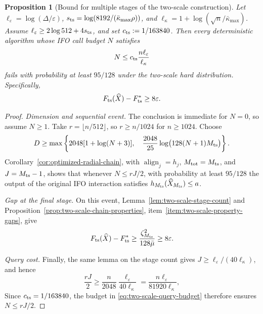 \documentclass{article}
\newtheorem{proposition}[theorem]{Proposition}
\theoremstyle{definition}
\begin{document}
\begin{proposition}[Bound for multiple stages of the two-scale construction]
\label{prop:two-scale-high-precision}
Let
$\ell_\varepsilon=\log(\Delta/\varepsilon)$,
$s_{\rm ts}=\log(8192/(\bar\kappa_{\max}\rho))$, and
$\ell_\kappa=1+\log(\sqrt n/\bar\kappa_{\max})$.
Assume
$\ell_\varepsilon\ge2\log512+4s_{\rm ts}$, and set
$c_{\rm ts}:=1/163840$.
Then every deterministic algorithm whose IFO call budget $N$ satisfies
\begin{equation}
 N\le c_{\rm ts}\frac{n\ell_\varepsilon}{\ell_\kappa}
 \label{eq:two-scale-query-budget}
\end{equation}
fails with probability at least $95/128$ under the two-scale hard
distribution.  Specifically,
\begin{equation}
 F_{\rm ts}(\widehat X)-F_{\rm ts}^*\ge8\varepsilon.
\end{equation}
\end{proposition}

\begin{proof}
\emph{Dimension and sequential event.}
The conclusion is immediate for $N=0$, so assume $N\ge1$.
Take $r=\lfloor n/512\rfloor$, so $r\ge n/1024$ for $n\ge1024$.
Choose
\begin{equation}
 D\ge\max\left\{
 2048[1+\log(N+3)],\quad
  \frac{2048}{25}\log\bigl(128(N+1)M_{\rm ts}\bigr)
 \right\}.
 \label{eq:two-scale-sequential-dimension}
\end{equation}
Corollary~\ref{cor:optimized-radial-chain}, with
$\operatorname{align}_j=h_j$, $M_{\rm tot}=M_{\rm ts}$, and
$J=M_{\rm ts}-1$, shows that whenever $N\le rJ/2$, with probability
at least $95/128$ the output of the original IFO interaction satisfies
$h_{M_{\rm ts}}(\widehat X_{M_{\rm ts}})\le a$.

\emph{Gap at the final stage.}
On this event, Lemma~\ref{lem:two-scale-stage-count} and
Proposition~\ref{prop:two-scale-chain-properties},
item~\ref{item:two-scale-property-gaps}, give
\begin{equation}
 F_{\rm ts}(\widehat X)-F_{\rm ts}^*
 \ge\frac{\zeta_{M_{\rm ts}}^2}{128\bar\mu}
 \ge8\varepsilon.
\end{equation}

\emph{Query cost.}
Finally, the same lemma on the stage count gives
$J\ge\ell_\varepsilon/(40\ell_\kappa)$, and hence
\begin{equation}
 \frac{rJ}{2}
 \ge\frac{n}{2048}\frac{\ell_\varepsilon}{40\ell_\kappa}
 =\frac{n\ell_\varepsilon}{81920\ell_\kappa},
\end{equation}
Since $c_{\rm ts}=1/163840$, the budget in
\eqref{eq:two-scale-query-budget} therefore ensures $N\le rJ/2$.
\end{proof}
\end{document}
